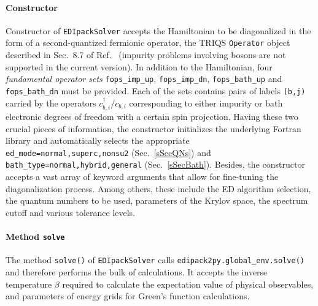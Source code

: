 \documentclass[edipack2.tex]{subfiles}
\begin{document}
\paragraph{{\bf Constructor}}
Constructor of {\tt EDIpackSolver} accepts the Hamiltonian to be diagonalized
in the form of a second-quantized fermionic operator, the TRIQS {\tt Operator}
object described in Sec.~8.7 of Ref.~ (impurity 
problems involving bosons are not supported in the current version). In 
addition to the Hamiltonian, four {\it fundamental operator sets}
{\tt fops\_imp\_up}, {\tt fops\_imp\_dn}, {\tt fops\_bath\_up} and
{\tt fops\_bath\_dn} must be provided.
Each of the sets contains pairs of labels {\tt (b,j)} carried
by the operators $c^\dagger_{b,i} / c_{b,i}$ corresponding to either impurity
or bath electronic degrees of freedom with a certain spin projection.
Having these two crucial pieces of information, the constructor initializes
the underlying Fortran library and automatically selects the appropriate
{\tt ed\_mode=normal,superc,nonsu2} (Sec.~\ref{sSecQNs}) and
{\tt bath\_type=normal,hybrid,general} (Sec.~\ref{sSecBath}). Besides, the
constructor accepts a vast array of keyword arguments that allow for fine-tuning
the diagonalization process. Among others, these include the ED algorithm
selection, the quantum numbers to be used, parameters of the Krylov space,
the spectrum cutoff and various tolerance levels.

\paragraph{{\bf Method {\tt solve}}}
The method {\tt solve()} of {\tt EDIpackSolver} calls
{\tt edipack2py.global\_env.solve()} and therefore performs the bulk of
calculations. It accepts the inverse temperature $\beta$ required to calculate
the expectation value of physical observables, and parameters of energy grids
for Green's function calculations.
\end{document}
